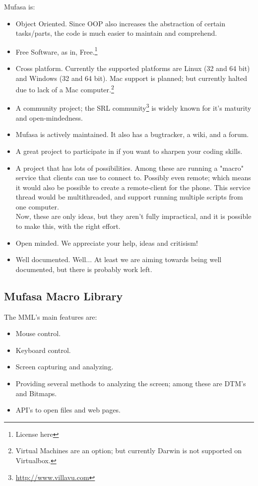 \documentclass[a4paper, 10pt]{report} %
\begin{document}
Mufasa is:
\begin{itemize}
	\item Object Oriented. Since OOP also increases the abstraction of
		  certain tasks/parts, the code is much easier to maintain and
		  comprehend.
	\item Free Software, as in, Free.\footnote{License here}
	\item Cross platform. Currently the supported platforms are Linux 
		  (32 and 64 bit) and Windows (32 and 64 bit).
		  Mac support is planned; but currently halted due to lack of a
		  Mac computer.\footnote{Virtual Machines are an option;
		  but currently Darwin is not supported on Virtualbox.}
	\item A community project; the SRL community\footnote{
			\url{http://www.villavu.com}}
		  is widely known for it's maturity and open-mindedness.
	\item Mufasa is actively maintained. It also has a bugtracker,
		  a wiki, and a forum.
	\item A great project to participate in if you want to sharpen your
		  coding skills.
		  \pagebreak
	\item A project that has lots of possibilities. Among these are
		  running a "macro" service that clients can use to 
		  connect to. Possibly even remote; which means it would
		  also be possible to create a remote-client for the phone.
		  This service thread would be multithreaded, and support
		  running multiple scripts from one computer. \\
		  Now, these are only ideas, but they aren't fully impractical,
		  and it is possible to make this, with the right effort. \\
	\item Open minded. We appreciate your help, ideas and critisism!
	\item Well documented. Well... At least we are aiming towards being
		  well documented, but there is probably work left.
\end{itemize}

\pagebreak

\subsection{Mufasa Macro Library}

The MML's main features are:
\begin{itemize}
	\item Mouse control.
	\item Keyboard control.
	\item Screen capturing and analyzing.
	\item Providing several methods to analyzing the screen; among these
		  are DTM's and Bitmaps.
	\item API's to open files and web pages.
\end{itemize}
\end{document}
